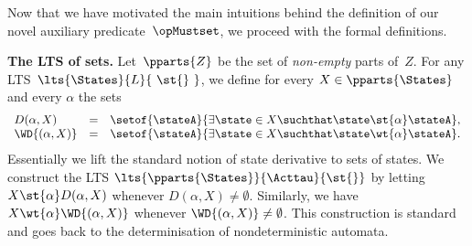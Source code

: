 Now that we have motivated the main intuitions behind the definition of our
novel auxiliary predicate~$\opMustset$, we proceed with the formal definitions.

{\bfseries The LTS of sets.}
Let~$\pparts{ Z }$ be the set of  {\em non-empty} parts of~$Z$.
For any LTS~$\lts{\States}{ L }{~\st{}~}$, we define
for every $ X \in \pparts{ \States } $ and every $\alpha$ the sets
$$
\begin{array}{lll}
D{(\alpha, X)} & = & \setof{ \stateA }{ \exists \state \in X \suchthat \state \st{\alpha} \stateA },\\
\WD{(\alpha, X)} & = & \setof{ \stateA }{ \exists \state \in X \suchthat \state \wt{\alpha} \stateA }.
\end{array}
$$
Essentially we lift the standard notion of state derivative to sets of states.
We construct the LTS $\lts{\pparts{ \States }}{ \Acttau }{ \st{} }$
by letting $ X \st{ \alpha } D{(\alpha, X)}$ whenever $D{(\alpha, X)} \neq \emptyset$.
Similarly, we have $X \wt{ \alpha } \WD{(\alpha, X)}$ whenever $\WD{(\alpha, X)} \neq \emptyset$.
This construction is standard \cite{DBLP:conf/avmfss/CleavelandH89,DBLP:conf/aplas/BonchiCPS13,DBLP:journals/lmcs/BonchiSV22}
  and goes back to the determinisation of nondeterministic automata.

